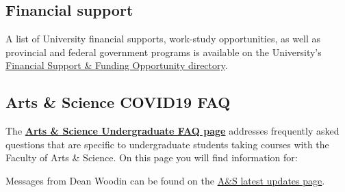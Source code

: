 \documentclass[
]{book}
\begin{document}
\hypertarget{financial-support}{%
\subsection{Financial support}\label{financial-support}}

A list of University financial supports, work-study opportunities, as well as provincial and federal government programs is available on the University's \href{https://www.viceprovoststudents.utoronto.ca/covid-19/funding-opportunity-directory/}{Financial Support \& Funding Opportunity directory}.

\hypertarget{arts-science-covid19-faq}{%
\subsection{Arts \& Science COVID19 FAQ}\label{arts-science-covid19-faq}}

The \href{https://www.artsci.utoronto.ca/covid19-artsci-student-faqs}{\textbf{Arts \& Science Undergraduate FAQ page}} addresses frequently asked questions that are specific to undergraduate students taking courses with the Faculty of Arts \& Science. On this page you will find information for:

Messages from Dean Woodin can be found on the \href{https://www.artsci.utoronto.ca/news/covid-19-and-u-ts-response-latest-updates-and-faqs}{A\&S latest updates page}.

  
\end{document}
